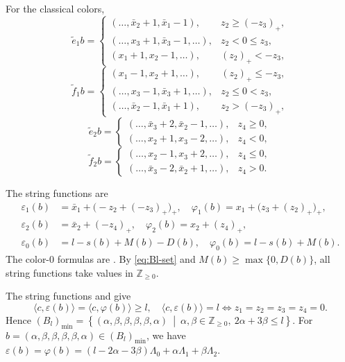 \documentclass[11pt,reqno]{amsart}
\newcommand{\Zge}{\mathbb Z_{\ge 0}}
\numberwithin{table}{section}
\numberwithin{equation}{section}
\theoremstyle{plain}
\theoremstyle{definition}
\begin{document}
For the classical colors,
\begin{equation}\label{eq:e1}
	\widetilde e_1b
	=
	\begin{cases}
		(\ldots,\bar x_2+1,\bar x_1-1),
		&z_2\ge(-z_3)_+,\\
		(\ldots,x_3+1,\bar x_3-1,\ldots),
		&z_2<0\le z_3,\\
		(x_1+1,x_2-1,\ldots),
		&(z_2)_+<-z_3,
	\end{cases}
\end{equation}
\begin{equation}\label{eq:f1}
	\widetilde f_1b
	=
	\begin{cases}
		(x_1-1,x_2+1,\ldots),
		&(z_2)_+\le-z_3,\\
		(\ldots,x_3-1,\bar x_3+1,\ldots),
		&z_2\le0<z_3,\\
		(\ldots,\bar x_2-1,\bar x_1+1),
		&z_2>(-z_3)_+,
	\end{cases}
\end{equation}
\begin{equation}\label{eq:e2}
	\widetilde e_2b
	=
	\begin{cases}
		(\ldots,\bar x_3+2,\bar x_2-1,\ldots),
		&z_4\ge0,\\
		(\ldots,x_2+1,x_3-2,\ldots),
		&z_4<0,
	\end{cases}
\end{equation}
\begin{equation}\label{eq:f2}
	\widetilde f_2b
	=
	\begin{cases}
		(\ldots,x_2-1,x_3+2,\ldots),
		&z_4\le0,\\
		(\ldots,\bar x_3-2,\bar x_2+1,\ldots),
		&z_4>0.
	\end{cases}
\end{equation}

The string functions are
\begin{align}
	\varepsilon_1(b)
	&=
	\bar x_1+\bigl(-z_2+(-z_3)_+\bigr)_+,
	\quad
	\varphi_1(b)
	=
	x_1+\bigl(z_3+(z_2)_+\bigr)_+,
	\label{eq:epsphi1}\\
	\varepsilon_2(b)
	&=
	\bar x_2+(-z_4)_+,
	\quad
	\varphi_2(b)
	=
	x_2+(z_4)_+,
	\label{eq:epsphi2}\\
	\varepsilon_0(b)
	&=
	l-s(b)+M(b)-D(b),
	\quad
	\varphi_0(b)
	=
	l-s(b)+M(b).
	\label{eq:epsphi0}
\end{align}
The color-\(0\) formulas are
\cite[Proposition~4.4]{KMOY}.
By \eqref{eq:Bl-set} and \(M(b)\ge\max\{0,D(b)\}\),
all string functions take values in \(\Zge\).

The string functions and \cite[Lemma~7.1]{KMOY} give
\[
\langle c,\varepsilon(b)\rangle
=
\langle c,\varphi(b)\rangle
\ge l,
\quad
\langle c,\varepsilon(b)\rangle=l
\iff
z_1=z_2=z_3=z_4=0.
\]
Hence $(B_l)_{\min}
=
\left\{
(\alpha,\beta,\beta,\beta,\beta,\alpha)
\ \middle|\
\alpha,\beta\in\Zge,\ 
2\alpha+3\beta\le l
\right\}$.
For
\(b=(\alpha,\beta,\beta,\beta,\beta,\alpha)\in(B_l)_{\min}\), we have $\varepsilon(b)
=
\varphi(b)
=
(l-2\alpha-3\beta)\Lambda_0
+\alpha\Lambda_1+\beta\Lambda_2$.
\end{document}
